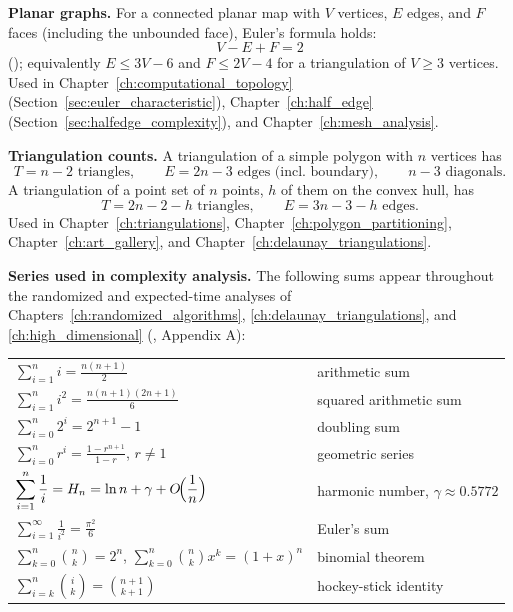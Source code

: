 \medskip\noindent\textbf{Planar graphs.}
For a connected planar map with $V$ vertices, $E$ edges, and $F$ faces
(including the unbounded face), Euler's formula holds:
\[
  V - E + F = 2
\]
(\cite{euler1758}); equivalently $E \le 3V - 6$ and $F \le 2V - 4$ for a
triangulation of $V \ge 3$ vertices. Used in Chapter~\ref{ch:computational_topology}
(Section~\ref{sec:euler_characteristic}), Chapter~\ref{ch:half_edge}
(Section~\ref{sec:halfedge_complexity}), and Chapter~\ref{ch:mesh_analysis}.

\medskip\noindent\textbf{Triangulation counts.}
A triangulation of a simple polygon with $n$ vertices has
\[
  T = n - 2 \text{ triangles}, \qquad
  E = 2n - 3 \text{ edges (incl.\ boundary)}, \qquad
  n - 3 \text{ diagonals}.
\]
A triangulation of a point set of $n$ points, $h$ of them on the convex
hull, has
\[
  T = 2n - 2 - h \text{ triangles}, \qquad
  E = 3n - 3 - h \text{ edges}.
\]
Used in Chapter~\ref{ch:triangulations}, Chapter~\ref{ch:polygon_partitioning},
Chapter~\ref{ch:art_gallery}, and Chapter~\ref{ch:delaunay_triangulations}.

\medskip\noindent\textbf{Series used in complexity analysis.}
The following sums appear throughout the randomized and expected-time
analyses of Chapters~\ref{ch:randomized_algorithms},
\ref{ch:delaunay_triangulations}, and \ref{ch:high_dimensional}
(\cite{cormen2009}, Appendix A):
\begin{center}
\begin{tabular}{ll}
\toprule
$\displaystyle\sum_{i=1}^{n} i = \frac{n(n+1)}{2}$ &
  arithmetic sum \\
$\displaystyle\sum_{i=1}^{n} i^2 = \frac{n(n+1)(2n+1)}{6}$ &
  squared arithmetic sum \\
$\displaystyle\sum_{i=0}^{n} 2^i = 2^{n+1} - 1$ &
  doubling sum \\
$\displaystyle\sum_{i=0}^{n} r^i = \frac{1 - r^{n+1}}{1 - r}$, $r \neq 1$ &
  geometric series \\
$\displaystyle\sum_{i=1}^{n} \frac{1}{i} = H_n = \ln n + \gamma + O\!\Bigl(\frac{1}{n}\Bigr)$ &
  harmonic number, $\gamma \approx 0.5772$ \\
$\displaystyle\sum_{i=1}^{\infty} \frac{1}{i^2} = \frac{\pi^2}{6}$ &
  Euler's sum \\
$\displaystyle\sum_{k=0}^{n} \binom{n}{k} = 2^n$, 
  $\displaystyle\sum_{k=0}^{n} \binom{n}{k} x^k = (1+x)^n$ &
  binomial theorem \\
$\displaystyle\sum_{i=k}^{n} \binom{i}{k} = \binom{n+1}{k+1}$ &
  hockey-stick identity \\
\bottomrule
\end{tabular}
\end{center}

